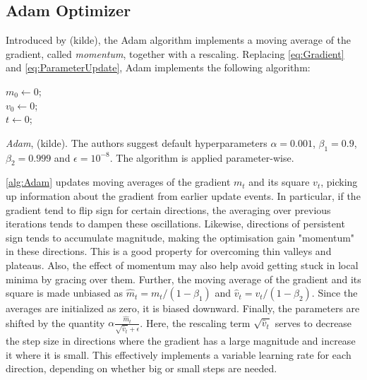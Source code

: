 \subsection{Adam Optimizer}\label{sec:AdamOptimizer}
Introduced by (kilde), the Adam algorithm implements a moving average of the gradient, called \emph{momentum}, together with a rescaling. Replacing \autoref{eq:Gradient} and \autoref{eq:ParameterUpdate}, Adam implements the following algorithm:

\begin{algorithm}[H]\label{alg:Adam}
\SetAlgoLined

$m_0 \gets 0$;\\
$v_0 \gets 0$;\\
$t \gets 0$;\\
\caption{\emph{Adam}, (kilde). The authors suggest default hyperparameters $\alpha = 0.001$, $\beta_1 = 0.9$, $\beta_2 = 0.999$ and $\epsilon = 10^{-8}$. The algorithm is applied parameter-wise.}
\end{algorithm}

\autoref{alg:Adam} updates moving averages of the gradient $m_t$ and its square $v_t$, picking up information about the gradient from earlier update events. In particular, if the gradient tend to flip sign for certain directions, the averaging over previous iterations tends to dampen these oscillations. Likewise, directions of persistent sign tends to accumulate magnitude, making the optimisation gain "momentum" in these directions. This is a good property for overcoming thin valleys and plateaus. Also, the effect of momentum may also help avoid getting stuck in local minima by gracing over them. Further, the moving average of the gradient and its square is made unbiased as $\hat{m}_t = m_t/(1-\beta_1)$ and $\hat{v}_t = v_t/(1-\beta_2)$. Since the averages are initialized as zero, it is biased downward. Finally, the parameters are shifted by the quantity $\alpha \frac{\hat{m}_t}{\sqrt{\hat{v}_t} + \epsilon}$. Here, the rescaling term $\sqrt{\hat{v}_t}$ serves to decrease the step size in directions where the gradient has a large magnitude and increase it where it is small. This effectively implements a variable learning rate for each direction, depending on whether big or small steps are needed. 

